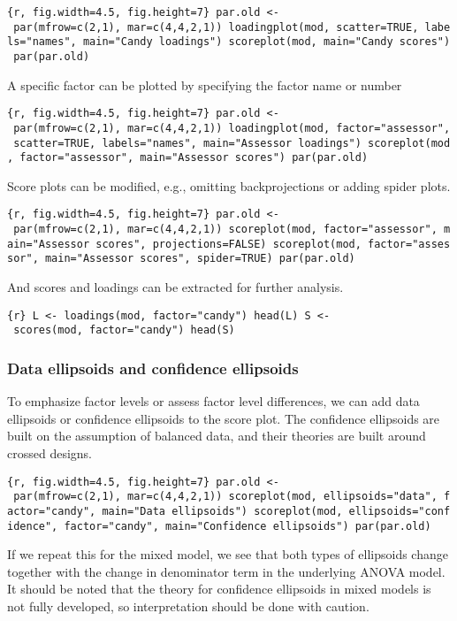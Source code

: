 \texttt{\{r,\ fig.width=4.5,\ fig.height=7\}\ par.old\ \textless{}-\ par(mfrow=c(2,1),\ mar=c(4,4,2,1))\ loadingplot(mod,\ scatter=TRUE,\ labels="names",\ main="Candy\ loadings")\ scoreplot(mod,\ main="Candy\ scores")\ par(par.old)}

A specific factor can be plotted by specifying the factor name or number

\texttt{\{r,\ fig.width=4.5,\ fig.height=7\}\ par.old\ \textless{}-\ par(mfrow=c(2,1),\ mar=c(4,4,2,1))\ loadingplot(mod,\ factor="assessor",\ scatter=TRUE,\ labels="names",\ main="Assessor\ loadings")\ scoreplot(mod,\ factor="assessor",\ main="Assessor\ scores")\ par(par.old)}

Score plots can be modified, e.g., omitting backprojections or adding
spider plots.

\texttt{\{r,\ fig.width=4.5,\ fig.height=7\}\ par.old\ \textless{}-\ par(mfrow=c(2,1),\ mar=c(4,4,2,1))\ scoreplot(mod,\ factor="assessor",\ main="Assessor\ scores",\ projections=FALSE)\ scoreplot(mod,\ factor="assessor",\ main="Assessor\ scores",\ spider=TRUE)\ par(par.old)}

And scores and loadings can be extracted for further analysis.

\texttt{\{r\}\ L\ \textless{}-\ loadings(mod,\ factor="candy")\ head(L)\ S\ \textless{}-\ scores(mod,\ factor="candy")\ head(S)}

\subsubsection{Data ellipsoids and confidence
ellipsoids}\label{data-ellipsoids-and-confidence-ellipsoids}

To emphasize factor levels or assess factor level differences, we can
add data ellipsoids or confidence ellipsoids to the score plot. The
confidence ellipsoids are built on the assumption of balanced data, and
their theories are built around crossed designs.

\texttt{\{r,\ fig.width=4.5,\ fig.height=7\}\ par.old\ \textless{}-\ par(mfrow=c(2,1),\ mar=c(4,4,2,1))\ scoreplot(mod,\ ellipsoids="data",\ factor="candy",\ main="Data\ ellipsoids")\ scoreplot(mod,\ ellipsoids="confidence",\ factor="candy",\ main="Confidence\ ellipsoids")\ par(par.old)}

If we repeat this for the mixed model, we see that both types of
ellipsoids change together with the change in denominator term in the
underlying ANOVA model. It should be noted that the theory for
confidence ellipsoids in mixed models is not fully developed, so
interpretation should be done with caution.

